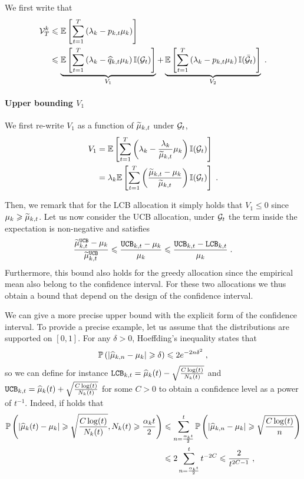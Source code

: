 We first write that 
\begin{align*}
\mathcal{V}_T^k &\leqslant \mathbb{E}\left[\sum_{t=1}^T \left(\lambda_k-p_{k, t} \mu_k \right)\right] \\
&
\leqslant  \underbrace{\mathbb{E}\left[\sum_{t=1}^T \left(\lambda_k-\widehat{q}_{k,t} \mu_k \right) \mathbb{I}(\mathcal{G}_t)\right]}_{V_1} + \underbrace{\mathbb{E}\left[\sum_{t=1}^T \left(\lambda_k-p_{k, t} \mu_k \right) \mathbb{I}(\bar {\mathcal{G}}_t)\right]}_{V_2} \;. \\
\end{align*}

\paragraph{Upper bounding $V_1$} We first re-write $V_1$ as a function of $\widetilde{\mu}_{k, t}$ under $\mathcal{G}_t$, 
\begin{align*}
V_1 & = \mathbb{E}\left[\sum_{t=1}^T \left(\lambda_k- \frac{\lambda_k}{\widetilde{\mu}_{k, t}} \mu_k \right) \mathbb{I}(\mathcal{G}_t)\right] \\
& = \lambda_k \mathbb{E}\left[\sum_{t=1}^T \left(\frac{\widetilde{\mu}_{k,t}-\mu_k}{\widetilde{\mu}_{k,t}}\right) \mathbb{I}(\mathcal{G}_t)\right]\;.
\end{align*}

Then, we remark that for the LCB allocation it simply holds that $V_1\leq 0$ since $\mu_k\geqslant \widetilde{\mu}_{k,t}$. Let us now consider the UCB allocation, under $\mathcal{G}_t$ the term inside the expectation is non-negative and satisfies 
\[\frac{\widetilde{\mu}_{k,t}^{\texttt{UCB}}-\mu_k}{\widetilde{\mu}_{k,t}^{\texttt{UCB}}} \leqslant \frac{\texttt{UCB}_{k,t}-\mu_k}{\mu_k} \leqslant \frac{\texttt{UCB}_{k,t}-\texttt{LCB}_{k, t}}{\mu_k} \;. \]
Furthermore, this bound also holds for the greedy allocation since the empirical mean also belong to the confidence interval. For these two allocations we thus obtain a bound that depend on the design of the confidence interval. 

We can give a more precise upper bound with the explicit form of the confidence interval. To provide a precise example, let us assume that the distributions are supported on $[0,1]$. For any $\delta>0$, Hoeffding's inequality states that 
\[\mathbb{P}\left(|\widehat{\mu}_{k, n}-\mu_k|\geqslant \delta \right)\leqslant 2e^{-2n\delta^2}\;, \]
so we can define for instance $\texttt{LCB}_{k,t} = \widehat{\mu}_k(t) - \sqrt{\frac{C\log(t)}{N_k(t)}} $ and $\texttt{UCB}_{k,t} = \widehat{\mu}_k(t) + \sqrt{\frac{C\log(t)}{N_k(t)}}$ for some $C>0$ to obtain a confidence level as a power of $t^{-1}$. Indeed, if holds that 
\begin{align*} \mathbb{P}\left(|\widehat{\mu}_k(t)- \mu_k|\geqslant \sqrt{\frac{C\log(t)}{N_k(t)}}, N_k(t)\geqslant \frac{\alpha_k t}{2} \right)&\leqslant \sum_{n=\frac{\alpha_k t}{2}}^t \mathbb{P}\left(|\widehat{\mu}_{k, n}- \mu_k|\geqslant \sqrt{\frac{C\log(t)}{n}}\right)  \\
&\leqslant 2 \sum_{n=\frac{\alpha_k t}{2}}^t t^{-2C}\leqslant \frac{2}{t^{2C-1}} \;,
\end{align*}

